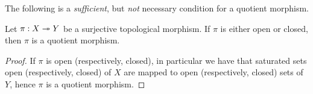 The following is a \emph{sufficient}, but \emph{not} necessary condition for a
quotient morphism.

\begin{proposition}
Let \(\pi: X \twoheadrightarrow Y\) be a surjective topological morphism. If \(\pi\) is either
open or closed, then \(\pi\) is a quotient morphism.
\end{proposition}

\begin{proof}
If \(\pi\) is open (respectively, closed), in particular we have that saturated
sets open (respectively, closed) of \(X\) are mapped to open (respectively,
closed) sets of \(Y\), hence \(\pi\) is a quotient morphism.
\end{proof}
